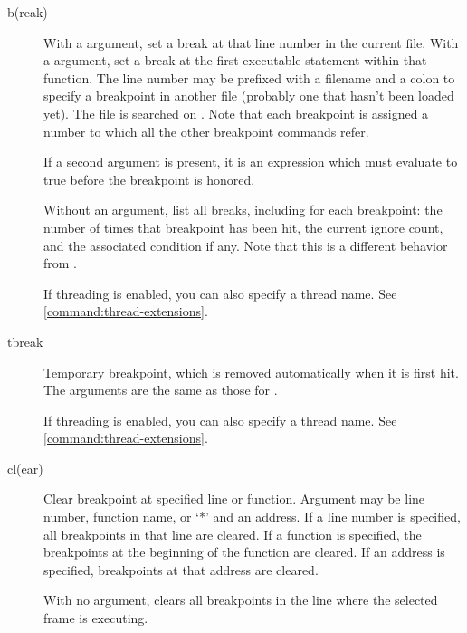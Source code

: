 \begin{description}
\item[b(reak) ]\label{command:break}

With a  argument, set a break at that line number in the
current file.  With a  argument, set a break at the
first executable statement within that function.  The line number may
be prefixed with a filename and a colon to specify a breakpoint in
another file (probably one that hasn't been loaded yet).  The file is
searched on .  Note that each breakpoint is assigned a
number to which all the other breakpoint commands refer.

If a second argument is present, it is an expression which must
evaluate to true before the breakpoint is honored.

Without an argument, list all breaks, including for each breakpoint:
the number of times that breakpoint has been hit, the current ignore
count, and the associated condition if any. Note that this is a
different behavior from .

If threading is enabled, you can also specify a thread name. See \ref{command:thread-extensions}.

\item[tbreak ]\label{command:tbreak}

Temporary breakpoint, which is removed automatically when it is
first hit.  The arguments are the same as those for .

If threading is enabled, you can also specify a thread name. See \ref{command:thread-extensions}.

\item[cl(ear) ]

Clear breakpoint at specified line or function.  Argument may be line
number, function name, or `*' and an address.  If a line number is
specified, all breakpoints in that line are cleared.  If a function is
specified, the breakpoints at the beginning of the function are cleared.  If an
address is specified, breakpoints at that address are cleared.

With no argument, clears all breakpoints in the line where the selected
frame is executing.


\end{description}
